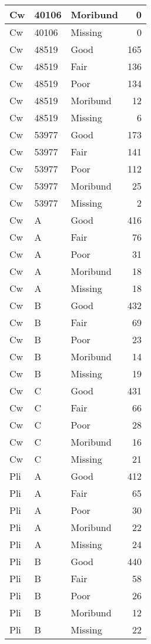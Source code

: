 \documentclass[
]{article}
\begin{document}
\begin{tabular}{l|l|l|r}
\hline
Cw & 40106 & Moribund & 0\\
\hline
Cw & 40106 & Missing & 0\\
\hline
Cw & 48519 & Good & 165\\
\hline
Cw & 48519 & Fair & 136\\
\hline
Cw & 48519 & Poor & 134\\
\hline
Cw & 48519 & Moribund & 12\\
\hline
Cw & 48519 & Missing & 6\\
\hline
Cw & 53977 & Good & 173\\
\hline
Cw & 53977 & Fair & 141\\
\hline
Cw & 53977 & Poor & 112\\
\hline
Cw & 53977 & Moribund & 25\\
\hline
Cw & 53977 & Missing & 2\\
\hline
Cw & A & Good & 416\\
\hline
Cw & A & Fair & 76\\
\hline
Cw & A & Poor & 31\\
\hline
Cw & A & Moribund & 18\\
\hline
Cw & A & Missing & 18\\
\hline
Cw & B & Good & 432\\
\hline
Cw & B & Fair & 69\\
\hline
Cw & B & Poor & 23\\
\hline
Cw & B & Moribund & 14\\
\hline
Cw & B & Missing & 19\\
\hline
Cw & C & Good & 431\\
\hline
Cw & C & Fair & 66\\
\hline
Cw & C & Poor & 28\\
\hline
Cw & C & Moribund & 16\\
\hline
Cw & C & Missing & 21\\
\hline
Pli & A & Good & 412\\
\hline
Pli & A & Fair & 65\\
\hline
Pli & A & Poor & 30\\
\hline
Pli & A & Moribund & 22\\
\hline
Pli & A & Missing & 24\\
\hline
Pli & B & Good & 440\\
\hline
Pli & B & Fair & 58\\
\hline
Pli & B & Poor & 26\\
\hline
Pli & B & Moribund & 12\\
\hline
Pli & B & Missing & 22\\

\end{tabular}
\end{document}
